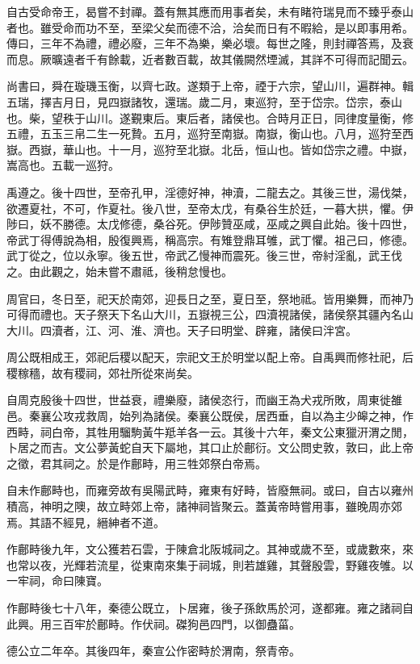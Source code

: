自古受命帝王，曷嘗不封禪。蓋有無其應而用事者矣，未有睹符瑞見而不臻乎泰山者也。雖受命而功不至，至梁父矣而德不洽，洽矣而日有不暇給，是以即事用希。傳曰，三年不為禮，禮必廢，三年不為樂，樂必壞。每世之隆，則封禪答焉，及衰而息。厥曠遠者千有餘載，近者數百載，故其儀闕然堙滅，其詳不可得而記聞云。

尚書曰，舜在璇璣玉衡，以齊七政。遂類于上帝，禋于六宗，望山川，遍群神。輯五瑞，擇吉月日，見四嶽諸牧，還瑞。歲二月，東巡狩，至于岱宗。岱宗，泰山也。柴，望秩于山川。遂覲東后。東后者，諸侯也。合時月正日，同律度量衡，修五禮，五玉三帛二生一死贄。五月，巡狩至南嶽。南嶽，衡山也。八月，巡狩至西嶽。西嶽，華山也。十一月，巡狩至北嶽。北岳，恒山也。皆如岱宗之禮。中嶽，嵩高也。五載一巡狩。

禹遵之。後十四世，至帝孔甲，淫德好神，神瀆，二龍去之。其後三世，湯伐桀，欲遷夏社，不可，作夏社。後八世，至帝太戊，有桑谷生於廷，一暮大拱，懼。伊陟曰，妖不勝德。太戊修德，桑谷死。伊陟贊巫咸，巫咸之興自此始。後十四世，帝武丁得傅說為相，殷復興焉，稱高宗。有雉登鼎耳雊，武丁懼。祖己曰，修德。武丁從之，位以永寧。後五世，帝武乙慢神而震死。後三世，帝紂淫亂，武王伐之。由此觀之，始未嘗不肅祗，後稍怠慢也。

周官曰，冬日至，祀天於南郊，迎長日之至，夏日至，祭地祗。皆用樂舞，而神乃可得而禮也。天子祭天下名山大川，五嶽視三公，四瀆視諸侯，諸侯祭其疆內名山大川。四瀆者，江、河、淮、濟也。天子曰明堂、辟雍，諸侯曰泮宮。

周公既相成王，郊祀后稷以配天，宗祀文王於明堂以配上帝。自禹興而修社祀，后稷稼穡，故有稷祠，郊社所從來尚矣。

自周克殷後十四世，世益衰，禮樂廢，諸侯恣行，而幽王為犬戎所敗，周東徙雒邑。秦襄公攻戎救周，始列為諸侯。秦襄公既侯，居西垂，自以為主少皞之神，作西畤，祠白帝，其牲用騮駒黃牛羝羊各一云。其後十六年，秦文公東獵汧渭之閒，卜居之而吉。文公夢黃蛇自天下屬地，其口止於鄜衍。文公問史敦，敦曰，此上帝之徵，君其祠之。於是作鄜畤，用三牲郊祭白帝焉。

自未作鄜畤也，而雍旁故有吳陽武畤，雍東有好畤，皆廢無祠。或曰，自古以雍州積高，神明之隩，故立畤郊上帝，諸神祠皆聚云。蓋黃帝時嘗用事，雖晚周亦郊焉。其語不經見，縉紳者不道。

作鄜畤後九年，文公獲若石雲，于陳倉北阪城祠之。其神或歲不至，或歲數來，來也常以夜，光輝若流星，從東南來集于祠城，則若雄雞，其聲殷雲，野雞夜雊。以一牢祠，命曰陳寶。

作鄜畤後七十八年，秦德公既立，卜居雍，後子孫飲馬於河，遂都雍。雍之諸祠自此興。用三百牢於鄜畤。作伏祠。磔狗邑四門，以御蠱菑。

德公立二年卒。其後四年，秦宣公作密畤於渭南，祭青帝。

